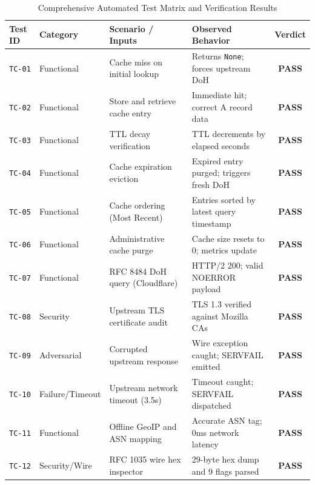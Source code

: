 \documentclass[10pt,a4paper]{article}
\begin{document}
\begin{table}[H]
\centering
\small
\caption{Comprehensive Automated Test Matrix and Verification Results}
\label{tab:test_suite}
\begin{tabularx}{\textwidth}{l l X p{3.4cm} c}
\toprule
\textbf{Test ID} & \textbf{Category} & \textbf{Scenario / Inputs} & \textbf{Observed Behavior} & \textbf{Verdict} \\
\midrule
\texttt{TC-01} & Functional & Cache miss on initial lookup & Returns \texttt{None}; forces upstream DoH & \textcolor{emeraldpass}{\textbf{PASS}} \\
\texttt{TC-02} & Functional & Store and retrieve cache entry & Immediate hit; correct A record data & \textcolor{emeraldpass}{\textbf{PASS}} \\
\texttt{TC-03} & Functional & TTL decay verification & TTL decrements by elapsed seconds & \textcolor{emeraldpass}{\textbf{PASS}} \\
\texttt{TC-04} & Functional & Cache expiration eviction & Expired entry purged; triggers fresh DoH & \textcolor{emeraldpass}{\textbf{PASS}} \\
\texttt{TC-05} & Functional & Cache ordering (Most Recent) & Entries sorted by latest query timestamp & \textcolor{emeraldpass}{\textbf{PASS}} \\
\texttt{TC-06} & Functional & Administrative cache purge & Cache size resets to 0; metrics update & \textcolor{emeraldpass}{\textbf{PASS}} \\
\texttt{TC-07} & Functional & RFC 8484 DoH query (Cloudflare) & HTTP/2 200; valid NOERROR payload & \textcolor{emeraldpass}{\textbf{PASS}} \\
\texttt{TC-08} & Security & Upstream TLS certificate audit & TLS 1.3 verified against Mozilla CAs & \textcolor{emeraldpass}{\textbf{PASS}} \\
\texttt{TC-09} & Adversarial & Corrupted upstream response & Wire exception caught; SERVFAIL emitted & \textcolor{emeraldpass}{\textbf{PASS}} \\
\texttt{TC-10} & Failure/Timeout & Upstream network timeout (3.5s) & Timeout caught; SERVFAIL dispatched & \textcolor{emeraldpass}{\textbf{PASS}} \\
\texttt{TC-11} & Functional & Offline GeoIP and ASN mapping & Accurate ASN tag; 0ms network latency & \textcolor{emeraldpass}{\textbf{PASS}} \\
\texttt{TC-12} & Security/Wire & RFC 1035 wire hex inspector & 29-byte hex dump and 9 flags parsed & \textcolor{emeraldpass}{\textbf{PASS}} \\

\end{tabularx}
\end{table}
\end{document}
